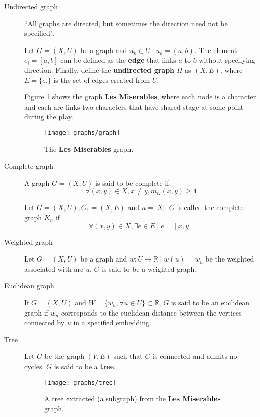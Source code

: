 \begin{description}
	\item[Undirected graph] ``All graphs are directed, but sometimes the direction need not be specified". \cite{berge1973}

	Let $G=(X, U)$ be a graph and $u_k \in U \mid u_k=(a, b)$. The element $e_i=[a, b]$ can be defined as the \textbf{edge} that links $a$ to $b$ without specifying direction. Finally, define the \textbf{undirected graph} $H$ as $(X, E)$, where $E=\{e_i\}$ is the set of edges created from $U$.

	Figure \ref{fig:graph} shows the graph \textbf{Les Miserables}, where each node is a character and each arc links two characters that have shared stage at some point during the play.

	\begin{figure}[H]
		\centering
		\texttt{[image: graphs/graph]}
		\caption{The \textbf{Les Miserables} graph.}
		\label{fig:graph}
	\end{figure}

	\item[Complete graph] A graph $G=(X, U)$ is said to be complete if
	$$\forall (x, y)\in X, x\ne y, m_G(x, y) \ge 1$$

	\begin{remark}
		Let $G=(X, U), G_1=(X, E)$ and $n=|X|$. $G$ is called the complete graph $K_n$ if
		$$\forall (x, y)\in X, \exists e \in E \mid e=[x, y]$$
	\end{remark}

	\item[Weighted graph] Let $G=(X, U)$ be a graph and $w\colon U \to \mathbb{R} \mid w(u) = w_u$ be the weighted associated with arc $u$. $G$ is said to be a weighted graph.

	\item[Euclidean graph] If $G=(X, U)$ and $W=\{w_u, \forall u\in U\}\subset \mathbb{R}$, $G$ is said to be an euclidean graph if $w_u$ corresponds to the euclidean distance between the vertices connected by $u$ in a specified embedding.

	\item[Tree] Let $G$ be the graph $(V, E)$ such that $G$ is connected and admits no cycles. $G$ is  said to be a \textbf{tree}. \cite{berge1973}

	\begin{figure}[H]
		\centering
		\texttt{[image: graphs/tree]}
		\captionsetup{justification=centering}
		\caption{A tree extracted (a subgraph) from the \textbf{Les Miserables} graph.}
		\label{tree}
	\end{figure}
\end{description}

